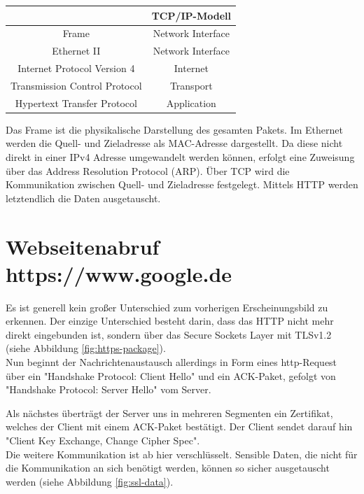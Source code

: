 \documentclass[paper=a4, fontsize=11pt]{scrreprt}
\numberwithin{equation}{section}
\numberwithin{figure}{section}
\numberwithin{table}{section}
\begin{document}
\begin{center}
\begin{tabular}{|c|c|}
\hline 
 & \textbf{TCP/IP-Modell}\\ 
\hline 
Frame & Network Interface\\ 
\hline 
Ethernet II & Network Interface\\ 
\hline
Internet Protocol Version 4 & Internet\\ 
\hline
Transmission Control Protocol & Transport\\ 
\hline
Hypertext Transfer Protocol & Application\\ 
\hline 
\end{tabular}
\end{center}

Das Frame ist die physikalische Darstellung des gesamten Pakets. Im Ethernet werden die Quell- und Zieladresse als MAC-Adresse dargestellt. Da diese nicht direkt in einer IPv4 Adresse umgewandelt werden können, erfolgt eine Zuweisung über das Address Resolution Protocol (ARP). Über TCP wird die Kommunikation zwischen Quell- und Zieladresse festgelegt. Mittels HTTP werden letztendlich die Daten ausgetauscht.

\section{Webseitenabruf https://www.google.de}

Es ist generell kein großer Unterschied zum vorherigen Erscheinungsbild zu erkennen. Der einzige Unterschied besteht darin, dass das HTTP nicht mehr direkt eingebunden ist, sondern über das Secure Sockets Layer mit TLSv1.2 (siehe Abbildung \ref{fig:https-package}).\\

Nun beginnt der Nachrichtenaustausch allerdings in Form eines http-Request über ein "Handshake Protocol: Client Hello" und ein ACK-Paket, gefolgt von "Handshake Protocol: Server Hello" vom Server.

Als nächstes überträgt der Server uns in mehreren Segmenten ein Zertifikat, welches der Client mit einem ACK-Paket bestätigt. Der Client sendet darauf hin "Client Key Exchange, Change Cipher Spec".\\

Die weitere Kommunikation ist ab hier verschlüsselt. Sensible Daten, die nicht für die Kommunikation an sich benötigt werden, können so sicher ausgetauscht werden (siehe Abbildung \ref{fig:ssl-data}).
\end{document}
